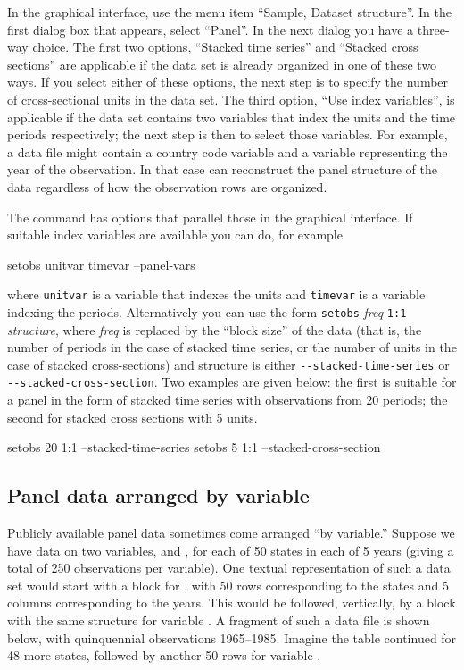 In the graphical interface, use the menu item ``Sample, Dataset
structure''.  In the first dialog box that appears, select ``Panel''.
In the next dialog you have a three-way choice.  The first two
options, ``Stacked time series'' and ``Stacked cross sections'' are
applicable if the data set is already organized in one of these two
ways.  If you select either of these options, the next step is to
specify the number of cross-sectional units in the data set.  The
third option, ``Use index variables'', is applicable if the data set
contains two variables that index the units and the time periods
respectively; the next step is then to select those variables.  For
example, a data file might contain a country code variable and a
variable representing the year of the observation.  In that case
 can reconstruct the panel structure of the data regardless
of how the observation rows are organized.

The  command has options that parallel those in the
graphical interface.  If suitable index variables are available
you can do, for example
\begin{code}
            setobs unitvar timevar --panel-vars
\end{code}
where \texttt{unitvar} is a variable that indexes the units and
\texttt{timevar} is a variable indexing the periods.  Alternatively
you can use the form \verb+setobs+ \textsl{freq} \verb+1:1+
\textsl{structure}, where \textsl{freq} is replaced by the ``block
size'' of the data (that is, the number of periods in the case of
stacked time series, or the number of units in the case of stacked
cross-sections) and structure is either \verb+--stacked-time-series+
or \verb+--stacked-cross-section+.  Two examples are given below: the
first is suitable for a panel in the form of stacked time series with
observations from 20 periods; the second for stacked cross sections
with 5 units.
\begin{code}
            setobs 20 1:1 --stacked-time-series
            setobs 5 1:1 --stacked-cross-section
\end{code}

\subsection{Panel data arranged by variable}

Publicly available panel data sometimes come arranged ``by variable.''
Suppose we have data on two variables,  and ,
for each of 50 states in each of 5 years (giving a total of 250
observations per variable).  One textual representation of such a data
set would start with a block for , with 50 rows
corresponding to the states and 5 columns corresponding to the years.
This would be followed, vertically, by a block with the same structure
for variable .  A fragment of such a data file is shown
below, with quinquennial observations 1965--1985.  Imagine the table
continued for 48 more states, followed by another 50 rows for variable
.

